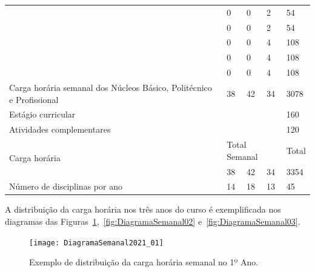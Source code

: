 \documentclass[11pt,fleqn]{book} %
\begin{document}
\begin{table}[H]
{\begin{tabular}{|l|l|l|l|l|l|}
			& \nameref{disc:biotecSaude}                                                   & 0          & 0         & 2         & 54        \\ \cline{2-6} 
			& \nameref{disc:biotecAmb}                                                     & 0          & 0         & 2         & 54        \\ \cline{2-6} 			
			& \nameref{disc:microbiologia}                                                 & 0          & 0         & 4         & 108       \\ \cline{2-6}
			& \nameref{disc:bioprocessos}                                                  & 0          & 0         & 4         & 108       \\ \cline{2-6} 
			& \nameref{disc:bioprodutos}                                                   & 0          & 0         & 4         & 108        \\ \hline			
			\multicolumn{2}{|l|}{Carga horária semanal dos Núcleos Básico, Politécnico e Profissional} %
			                                                                               & 38         & 42        & 34        & 3078      \\ \hline
			\multicolumn{5}{|l|}{Estágio curricular}                                                                            & 160       \\ \hline
			\multicolumn{5}{|l|}{Atividades complementares}                                                                     & 120       \\ \hline
			\multicolumn{2}{|l|}{\multirow{2}{*}{Carga horária}}                           & \multicolumn{3}{l|}{Total Semanal} & Total     \\ \cline{3-6} 
			\multicolumn{2}{|l|}{}                                                         & 38         & 42        & 34        & 3354      \\ \hline
			\multicolumn{2}{|l|}{Número de disciplinas por ano}                            & 14         & 18        & 13        & 45        \\ \hline
		\end{tabular}%
	}
\end{table}

A distribuição da carga horária nos três anos do curso é exemplificada nos diagramas das Figuras~\ref{fig:DiagramaSemanal01},~\ref{fig:DiagramaSemanal02} e~\ref{fig:DiagramaSemanal03}.

\begin{figure}[!htp]
	\centering
	\texttt{[image: DiagramaSemanal2021\_01]}
	\caption{Exemplo de distribuição da carga horária semanal no 1º Ano.}
	\label{fig:DiagramaSemanal01}
\end{figure}
\end{document}

